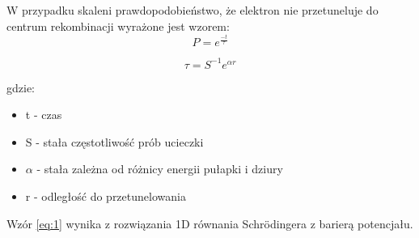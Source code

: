 W przypadku skaleni prawdopodobieństwo, że elektron nie przetuneluje do centrum rekombinacji wyrażone jest wzorem:
\cite{wzor}
\begin{equation}
\label{eq:1}
P = e^{\frac{-t}{\tau}}
\end{equation}

\begin{equation}
\tau = S^{-1}e^{\alpha r}
\end{equation}


gdzie:
\begin{itemize}
\item t - czas
\item S - stała częstotliwość prób ucieczki
\item $\alpha$ -  stała zależna od różnicy energii pułapki i dziury
\item r - odległość do przetunelowania
\end{itemize}

Wzór \ref{eq:1} wynika z rozwiązania 1D równania Schrödingera z barierą potencjału.





